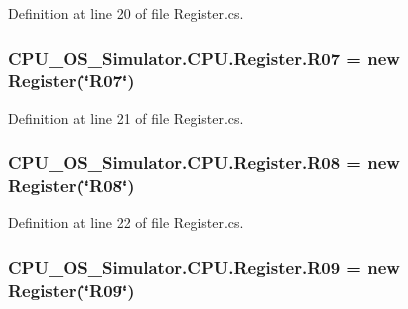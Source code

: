 Definition at line 20 of file Register.\+cs.

\hypertarget{class_c_p_u___o_s___simulator_1_1_c_p_u_1_1_register_a2224ffa8d2250d999afcddf739b5762b}{}
\subsubsection[{R07}]{ C\+P\+U\+\_\+\+O\+S\+\_\+\+Simulator.\+C\+P\+U.\+Register.\+R07 = new {\bf Register}(\char`\"{}R07\char`\"{})\hspace{0.3cm}{\ttfamily [static]}}\label{class_c_p_u___o_s___simulator_1_1_c_p_u_1_1_register_a2224ffa8d2250d999afcddf739b5762b}


Definition at line 21 of file Register.\+cs.

\hypertarget{class_c_p_u___o_s___simulator_1_1_c_p_u_1_1_register_a782cd395e24947e6bb509cbf61d090e2}{}
\subsubsection[{R08}]{ C\+P\+U\+\_\+\+O\+S\+\_\+\+Simulator.\+C\+P\+U.\+Register.\+R08 = new {\bf Register}(\char`\"{}R08\char`\"{})\hspace{0.3cm}{\ttfamily [static]}}\label{class_c_p_u___o_s___simulator_1_1_c_p_u_1_1_register_a782cd395e24947e6bb509cbf61d090e2}


Definition at line 22 of file Register.\+cs.

\hypertarget{class_c_p_u___o_s___simulator_1_1_c_p_u_1_1_register_a6d88d738c0794179adbe47a73359b769}{}
\subsubsection[{R09}]{ C\+P\+U\+\_\+\+O\+S\+\_\+\+Simulator.\+C\+P\+U.\+Register.\+R09 = new {\bf Register}(\char`\"{}R09\char`\"{})\hspace{0.3cm}{\ttfamily [static]}}\label{class_c_p_u___o_s___simulator_1_1_c_p_u_1_1_register_a6d88d738c0794179adbe47a73359b769}


